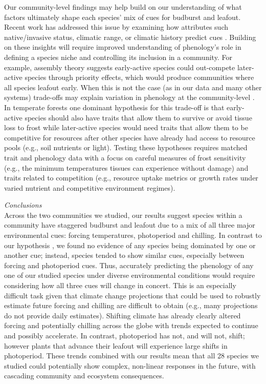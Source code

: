\documentclass[11pt]{article}
\begin{document}
Our community-level findings may help build on our understanding of what factors ultimately shape each species' mix of cues for budburst and leafout. Recent work has addressed this issue by examining how attributes such native/invasive status, climatic range, or climatic history predict cues \citep[e.g.,][]{Laube2015,zohner2017}. Building on these insights will require improved understanding of phenology's role in defining a species niche and controlling its inclusion in a community. For example, assembly theory suggests early-active species could out-compete later-active species through priority effects, which would produce communities where all species leafout early. When this is not the case (as in our data and many other systems) trade-offs may explain variation in phenology at the community-level \citep{Chesson:1997dz}. In temperate forests one dominant hypothesis for this trade-off is that early-active species should also have traits that allow them to survive or avoid tissue loss to frost \citep{Sakai:1987aa} while later-active species would need traits that allow them to be competitive for resources after other species have already had access to resource pools (e.g., soil nutrients or light). Testing these hypotheses requires matched trait and phenology data with a focus on careful measures of frost sensitivity (e.g., the minimum temperatures tissues can experience without damage) and traits related to competition (e.g., resource uptake metrics or growth rates under varied nutrient and competitive environment regimes).

\noindent \emph{Conclusions}\\
Across the two communities we studied, our results suggest species within a community have staggered budburst and leafout due to a mix of all three major environmental cues: forcing temperatures, photoperiod and chilling. In contrast to our hypothesis \citep[and others', e.g.,][]{Korner:2010}, we found no evidence of any species being dominated by one or another cue; instead, species tended to show similar cues, especially between forcing and photoperiod cues.  Thus, accurately predicting the phenology of any one of our studied species under diverse environmental conditions would require considering how all three cues will change in concert. This is an especially difficult task given that climate change projections that could be used to robustly estimate future forcing and chilling are difficult to obtain (e.g., many projections do not provide daily estimates). Shifting climate has already clearly altered forcing and potentially chilling across the globe \citep{ipcc2013,IPCC:2014sm} with trends expected to continue and possibly accelerate. In contrast, photoperiod has not, and will not, shift; however plants that advance their leafout will experience large shifts in photoperiod. These trends combined with our results mean that all 28 species we studied could potentially show complex, non-linear responses in the future, with cascading community and ecosystem consequences. 
\end{document}
